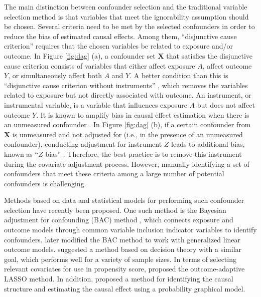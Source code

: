 The main distinction between confounder selection and the traditional variable selection method is that variables that meet the ignorability assumption should be chosen. Several criteria need to be met by the selected confounders in order to reduce the bias of estimated causal effects. Among them, ``disjunctive cause criterion'' \citep{vanderweele2019principles} requires that the chosen variables be related to exposure and/or outcome. In Figure \ref{fig:dag} (a), a confounder set $\boldsymbol{X}$ that satisfies the disjunctive cause criterion consists of variables that either affect exposure $A$, affect outcome $Y$, or simultaneously affect both $A$ and $Y$. A better condition than this is ``disjunctive cause criterion without instruments'' \citep{vanderweele2019principles}, which removes the variables related to exposure but not directly associated with outcome. An instrument, or instrumental variable, is a variable that influences exposure $A$ but does not affect outcome $Y$. It is known to amplify bias in causal effect estimation when there is an unmeasured confounder \citep{myers2011effects}. In Figure \ref{fig:dag} (b), if a certain confounder from $\boldsymbol{X}$ is unmeasured and not adjusted for (i.e., in the presence of an unmeasured confounder), conducting adjustment for instrument $Z$ leads to additional bias, known as ``$Z$-bias'' \citep{ding2017instrumental}. Therefore, the best practice is to remove this instrument during the covariate adjustment process. However, manually identifying a set of confounders that meet these criteria among a large number of potential confounders is challenging.

Methods based on data and statistical models for performing such confounder selection have recently been proposed. One such method is the Bayesian adjustment for confounding (BAC) method \citep[proposed by][]{wang2012bayesian,lefebvre2014extending}, which connects exposure and outcome models through common variable inclusion indicator variables to identify confounders. \cite{wang2015accounting} later modified the BAC method to work with generalized linear outcome models. \cite{wilson2014confounder} suggested a method based on decision theory with a similar goal, which performs well for a variety of sample sizes. In terms of selecting relevant covariates for use in propensity score, \cite{shortreed2017outcome} proposed the outcome-adaptive LASSO method. In addition, \cite{haggstrom2018data} proposed a method for identifying the causal structure and estimating the causal effect using a probability graphical model.

